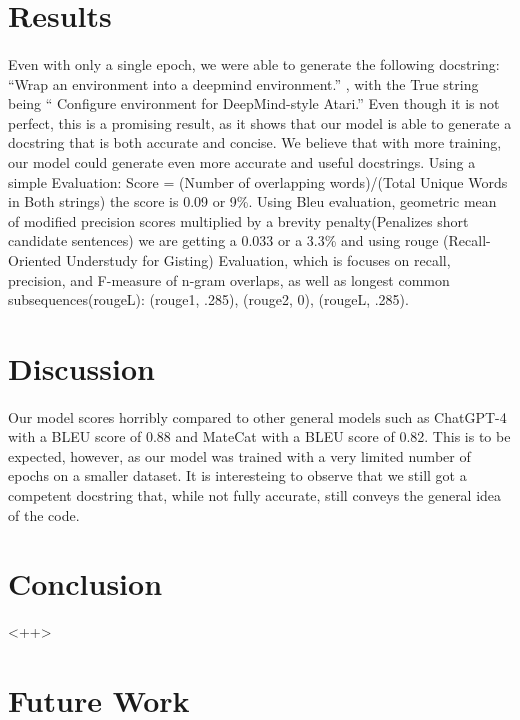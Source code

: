 \documentclass[12pt]{article}
\begin{document}
	\section{Results}
	\paragraph{} Even with only a single epoch, we were able to generate the following docstring: “Wrap an environment into a deepmind environment.” , with the True string being “ Configure environment for DeepMind-style Atari.” Even though it is not perfect, this is a promising result, as it shows that our model is able to generate a docstring that is both accurate and concise. We believe that with more training, our model could generate even more accurate and useful docstrings. Using a simple Evaluation: Score = (Number of overlapping words)/(Total Unique Words in Both strings) the score is 0.09 or 9\%. Using Bleu evaluation, geometric mean of modified precision scores multiplied by a brevity penalty(Penalizes short candidate sentences) we are getting a 0.033 or a 3.3\% and using rouge (Recall-Oriented Understudy for Gisting) Evaluation, which is focuses on recall, precision, and F-measure of n-gram overlaps, as well as longest common subsequences(rougeL): (rouge1, .285), (rouge2, 0), (rougeL, .285).

	\section{Discussion}
	\paragraph{} Our model scores horribly compared to other general models such as ChatGPT-4 with a BLEU score of 0.88 and MateCat with a BLEU score of 0.82. \cite{ghassemiazghandi2024evaluation} This is to be expected, however, as our model was trained with a very limited number of epochs on a smaller dataset. It is interesteing to observe that we still got a competent docstring that, while not fully accurate, still conveys the general idea of the code. 

	\section{Conclusion}
	<++>

	\section{Future Work}
\end{document}
